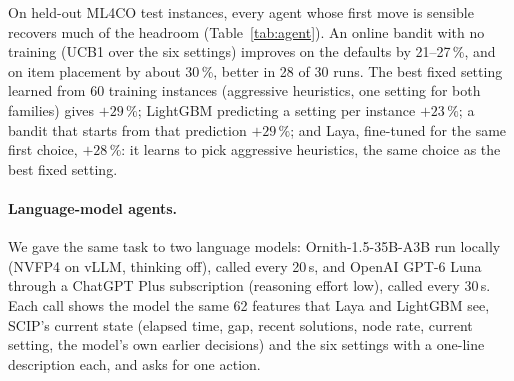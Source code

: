 \documentclass[11pt]{article}
\begin{document}
On held-out ML4CO test instances, every agent whose first move is sensible recovers much of the headroom
(Table~\ref{tab:agent}). An online bandit with no training (UCB1 over the six settings) improves on the defaults by
21--27\,\%, and on item placement by about 30\,\%, better in 28 of 30 runs. The best fixed setting learned from 60
training instances (aggressive heuristics, one setting for both families) gives $+29\,\%$; LightGBM predicting a setting per
instance $+23\,\%$; a bandit that starts from that prediction $+29\,\%$; and Laya, fine-tuned for the same first
choice, $+28\,\%$: it learns to pick aggressive heuristics, the same choice as the best fixed setting.


\paragraph{Language-model agents.} We gave the same task to two language models: Ornith-1.5-35B-A3B run locally
(NVFP4 on vLLM, thinking off), called every 20\,s, and OpenAI GPT-6 Luna through a ChatGPT Plus subscription
(reasoning effort low), called every 30\,s. Each call shows the model the same 62 features that Laya and LightGBM see,
SCIP's current state (elapsed time, gap, recent solutions, node rate, current setting, the model's own earlier
decisions) and the six settings with a one-line description each, and asks for one action.
\end{document}
